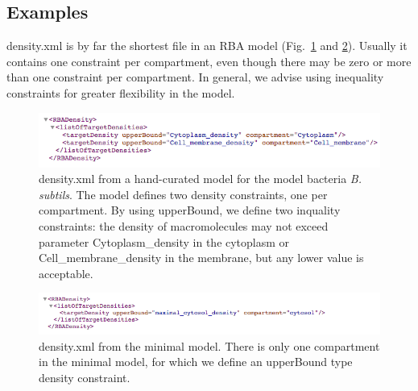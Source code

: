 \subsection{Examples}

density.xml is by far the shortest file in an RBA model
(Fig.~\ref{fig:density_ex_1} and \ref{fig:density_ex_2}).
Usually it contains one constraint per compartment,
even though there may be zero or more than one constraint per compartment.
In general, we advise using inequality constraints for greater flexibility
in the model.

\begin{figure}
  \centering
  \includegraphics[scale=0.6]{figures/density_ex_1}
  \caption{density.xml from a hand-curated model for the
  model bacteria \textit{B. subtils}.
  The model defines two density constraints, one per compartment.
  By using upperBound, we define two inquality constraints:
  the density of macromolecules may not exceed parameter
  Cytoplasm\_density in the cytoplasm or Cell\_membrane\_density in the membrane,
  but any lower value is acceptable.}
  \label{fig:density_ex_1}
\end{figure}

\begin{figure}
  \centering
  \includegraphics[scale=0.6]{figures/density_ex_2}
  \caption{density.xml from the minimal model.
  There is only one compartment in the minimal model,
  for which we define an upperBound type density constraint.}
  \label{fig:density_ex_2}
\end{figure}
